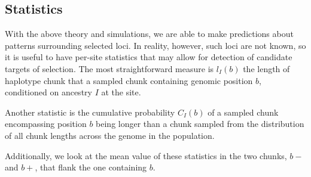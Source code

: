 \documentclass[12pt]{article}
\begin{document}
\subsection{Statistics}
With the above theory and simulations, we are able to make predictions about patterns surrounding selected loci. In reality, however, such loci are not known, so it is useful to have per-site statistics that may allow for detection of candidate targets of selection. The most straightforward measure is $l_I(b)$ the length of haplotype chunk that a sampled chunk containing genomic position $b$, conditioned on ancestry $I$ at the site.

Another statistic is the cumulative probability $C_I(b)$ of a sampled chunk encompassing position $b$ being longer than a chunk sampled from the distribution of all chunk lengths across the genome in the population. 

Additionally, we look at the mean value of these statistics in the two chunks, $b-$ and $b+$, that flank the one containing $b$.






\end{document}
